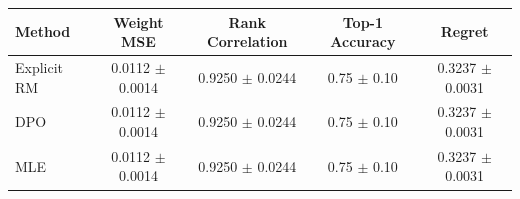 \begin{tabular}{lcccc}
\toprule
Method & Weight MSE & Rank Correlation & Top-1 Accuracy & Regret \\
\midrule
Explicit RM & 0.0112 $\pm$ 0.0014 & 0.9250 $\pm$ 0.0244 & 0.75 $\pm$ 0.10 & 0.3237 $\pm$ 0.0031 \\
DPO & 0.0112 $\pm$ 0.0014 & 0.9250 $\pm$ 0.0244 & 0.75 $\pm$ 0.10 & 0.3237 $\pm$ 0.0031 \\
MLE & 0.0112 $\pm$ 0.0014 & 0.9250 $\pm$ 0.0244 & 0.75 $\pm$ 0.10 & 0.3237 $\pm$ 0.0031 \\
\bottomrule
\end{tabular}
